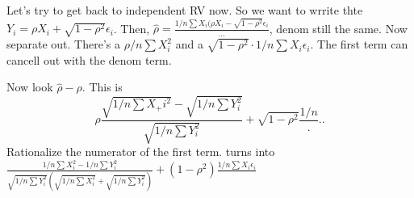 \documentclass{article}
\newcommand{\ep}{\epsilon}
\begin{document}
Let's try to get back to independent RV now. So we want to wrrite thte $Y_i=\rho X_i+\sqrt{1-\rho^2}\ep_i$. Then, $\hat\rho=\frac{1/n\sum X_i(\rho X_i-\sqrt{1-\rho^2}\ep_i}{...}$, denom still the same. Now separate out. There's a $\rho/n\sum X_i^2$ and a $\sqrt{1-\rho^2}\cdot1/n\sum X_i\ep_i$. The first term can cancell out with the denom term.

Now look $\hat{\rho}-\rho$. This is $$\rho\frac{\sqrt{1/n\sum X_+i^2}-\sqrt{1/n\sum Y_i^2}}{\sqrt{1/n\sum Y_i^2}}+\sqrt{1-\rho^2}\frac{1/n}...$$
Rationalize the numerator of the first term. turns into $\frac{1/n\sum X_i^2-1/n\sum Y_i^2}{\sqrt{1/n\sum Y_i^2}(\sqrt{1/n\sum X_i^2}+\sqrt{1/n\sum Y_i^2})}+(1-\rho^2)\frac{1/n\sum X_i\ep_i}{}$
\end{document}
